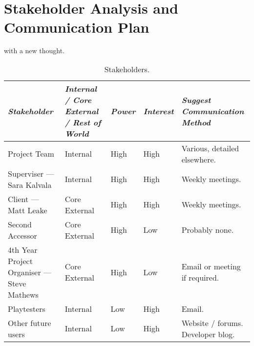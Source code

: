 \chapter[Stakeholder Analysis and Communication Plan]{Stakeholder Analysis and Communication Plan}
\label{ch:communication}

 with a new thought.

\begin{table*}
	\small
	\renewcommand{\arraystretch}{1.2}
	\begin{tabular}{p{20em} p{7em} p{3em} p{3em} p{13em}}
		\toprule
		\emph{Stakeholder} & \emph{Internal / Core External / Rest of World} & \emph{Power} & \emph{Interest} & \emph{Suggest Communication Method} \\
		\midrule
		
		Project Team & Internal & High & High & Various, detailed elsewhere. \\
		Superviser --- Sara Kalvala & Internal & High & High & Weekly meetings. \\
		Client --- Matt Leake & Core External & High & High & Weekly meetings. \\
		Second Accessor & Core External & High & Low & Probably none. \\
		4th Year Project Organiser --- Steve Mathews & Core External & High & Low & Email or meeting if required. \\
		Playtesters & Internal & Low & High & Email. \\
		Other future users & Internal & Low & High & Website / forums. Developer blog. \\
		\bottomrule
	\end{tabular}
	\vspace{1.5em}
	\caption{Stakeholders.}
	\label{tab:pancras}
\end{table*}
